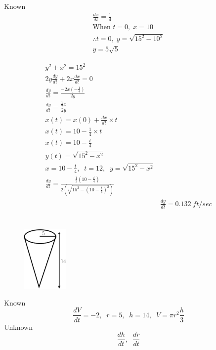 \documentclass[16pt letter]{article}
\begin{document}
Known
\begin{align*}
	\frac{dx}{dt} = \frac{1}{4}               \\
	\text{When } t = 0, \; x = 10             \\
	\therefore t = 0, \; y = \sqrt{15^2-10^2} \\
	y = 5\sqrt{5}
\end{align*}

\begin{align*}
	y^2 +x^2 = 15^2                                                                           \\
	2y\frac{dy}{dt} + 2x \frac{dx}{dt} = 0                                                    \\
	\frac{dy}{dt} = \frac{-2x(-\frac{1}{4})}{2y}                                              \\
	\frac{dy}{dt} = \frac{\frac{1}{2}x}{2y}                                                   \\[20pt]
	x(t) = x(0) + \frac{dx}{dt}  \times t                                                     \\
	x(t) = 10 - \frac{1}{4}  \times  t                                                        \\
	x(t) = 10 - \frac{t}{4}                                                                   \\
	y(t) = \sqrt{15^2-x^2}                                                                    \\[20pt]
	x = 10 - \frac{t}{4}, \;\; t = 12, \;\; y = \sqrt{15^2-x^2}                               \\
	\frac{dy}{dt} = \frac{\frac{1}{2}(10 - \frac{t}{4})}{2(\sqrt{15^2-(10 - \frac{t}{4})^2})} \\
	 & \frac{dy}{dt}  = 0.132\; ft/sec
\end{align*}


\section{}
\label{q:6}

\begin{figure}[h]
	\centering
	\includegraphics[width=0.20\textwidth]{Application Q6 A}
\end{figure}
Known \[\frac{dV}{dt} = -2, \;\; r= 5,\;\; h=14,\;\; V= \pi r^2 \frac{h}{3}\]
Unknown \[ \frac{dh}{dt},\;\; \frac{dr}{dt}\]
\end{document}
